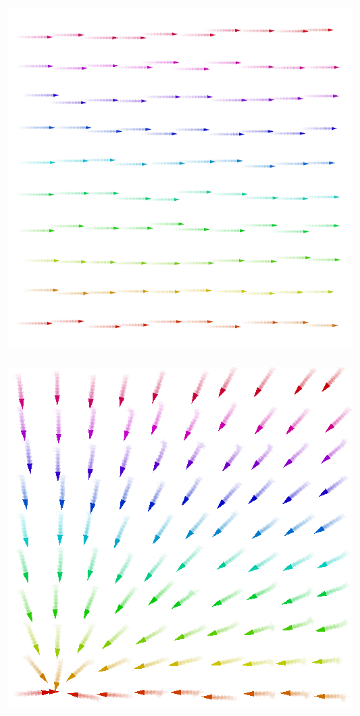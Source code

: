 \begin{figure}[t]
\centering
\begin{subfigure}{0.32\textwidth}
  \centering
  {\includegraphics[width=\textwidth]{papers/coordination2023-macro/images/constant.png}}
  \caption{}
  \label{coordination2023-macro:fig:constant}
\end{subfigure}
\hfill
\begin{subfigure}{0.32\textwidth}
  \centering
  {\includegraphics[width=\textwidth]{papers/coordination2023-macro/images/towards-leader.png}}

\end{subfigure}
\end{figure}
